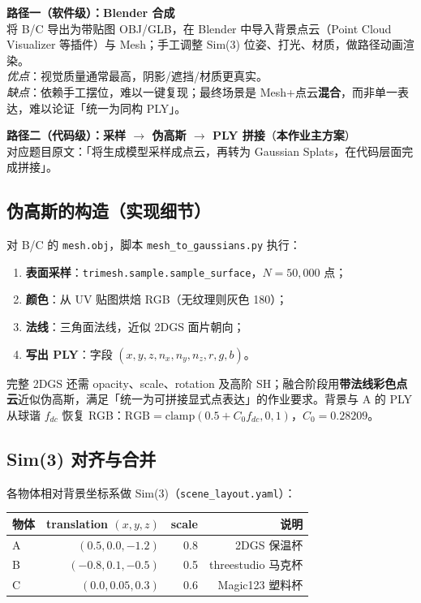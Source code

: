 \documentclass[11pt]{article}
\begin{document}
\textbf{路径一（软件级）：Blender 合成}\\
将 B/C 导出为带贴图 OBJ/GLB，在 Blender 中导入背景点云（Point Cloud Visualizer 等插件）与 Mesh；手工调整 Sim(3) 位姿、打光、材质，做路径动画渲染。\\
\textit{优点}：视觉质量通常最高，阴影/遮挡/材质更真实。\\
\textit{缺点}：依赖手工摆位，难以一键复现；最终场景是 Mesh+点云\textbf{混合}，而非单一表达，难以论证「统一为同构 PLY」。

\textbf{路径二（代码级）：采样 $\rightarrow$ 伪高斯 $\rightarrow$ PLY 拼接}（\textbf{本作业主方案}）\\
对应题目原文：「将生成模型采样成点云，再转为 Gaussian Splats，在代码层面完成拼接」。

\subsection{伪高斯的构造（实现细节）}

对 B/C 的 \texttt{mesh.obj}，脚本 \texttt{mesh\_to\_gaussians.py} 执行：
\begin{enumerate}
  \item \textbf{表面采样}：\texttt{trimesh.sample.sample\_surface}，$N=50{,}000$ 点；
  \item \textbf{颜色}：从 UV 贴图烘焙 RGB（无纹理则灰色 180）；
  \item \textbf{法线}：三角面法线，近似 2DGS 面片朝向；
  \item \textbf{写出 PLY}：字段 $(x,y,z,n_x,n_y,n_z,r,g,b)$。
\end{enumerate}
完整 2DGS 还需 opacity、scale、rotation 及高阶 SH；融合阶段用\textbf{带法线彩色点云}近似伪高斯，满足「统一为可拼接显式点表达」的作业要求。背景与 A 的 PLY 从球谐 $f_{dc}$ 恢复 RGB：$\text{RGB}=\text{clamp}(0.5 + C_0 f_{dc},0,1)$，$C_0=0.28209$。

\subsection{Sim(3) 对齐与合并}

各物体相对背景坐标系做 Sim(3)（\texttt{scene\_layout.yaml}）：

\begin{table}[h]
\centering
\small
\begin{tabular}{lrrr}
\toprule
物体 & translation $(x,y,z)$ & scale & 说明 \\
\midrule
A & $(0.5, 0.0, -1.2)$ & 0.8 & 2DGS 保温杯 \\
B & $(-0.8, 0.1, -0.5)$ & 0.5 & threestudio 马克杯 \\
C & $(0.0, 0.05, 0.3)$ & 0.6 & Magic123 塑料杯 \\
\bottomrule
\end{tabular}
\end{table}
\end{document}
